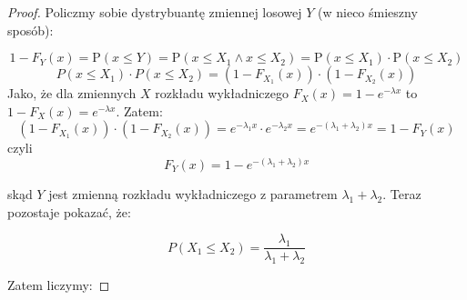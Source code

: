 \begin{proof}
	Policzmy sobie dystrybuantę zmiennej losowej \(Y\) (w nieco śmieszny sposób):

	\[
		1 - F_Y(x) = \mathrm{P}(x \leq Y) = \mathrm{P}(x \leq X_1 \land x \leq X_2) = \mathrm{P}(x \leq X_1) \cdot \mathrm{P}(x \leq X_2)
	\]
	\[
		P(x \leq X_1) \cdot P(x \leq X_2) = (1 - F_{X_1}(x)) \cdot (1 - F_{X_2}(x))
	\]
	Jako, że dla zmiennych \(X\) rozkładu wykładniczego \(F_{X}(x) = 1 - e^{- \lambda x}\) to \(1 - F_{X}(x) = e^{-\lambda x}\). Zatem:
	\[
		(1 - F_{X_1}(x)) \cdot (1 - F_{X_2}(x)) = e^{-\lambda_1 x} \cdot e^{-\lambda_2 x} = e^{-(\lambda_1 + \lambda_2)x} = 1 - F_Y(x)
	\]
	czyli
	\[
		F_Y(x) = 1 - e^{-(\lambda_1 + \lambda_2)x}
	\]

	skąd \(Y\) jest zmienną rozkładu wykładniczego z parametrem \( \lambda_1 + \lambda_2\). Teraz pozostaje pokazać, że:

	\[
		P(X_1 \leq X_2) = \frac{\lambda_1}{\lambda_1 + \lambda_2}
	\]

	Zatem liczymy:


\end{proof}
